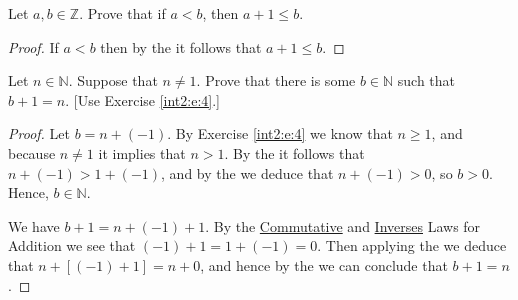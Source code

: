 \Newpage
\begin{exercise} %
	Let $a, b \in \mathbb{Z}$. Prove that if $a < b$, then $a + 1 \leq b$.
\end{exercise}

\begin{proof}
	If $a < b$ then by the  it follows that $a + 1 \leq b$.
\end{proof}


\Newpage
\begin{exercise} %
	\label{int2:e:6}
	Let $n \in \mathbb{N}$. Suppose that $n \neq 1$. Prove that there is some $b \in \mathbb{N}$ such that $b + 1 = n$.
	\hfill [Use Exercise \ref{int2:e:4}.]
\end{exercise}

\begin{proof}
	Let $b = n + (-1)$. By Exercise \ref{int2:e:4} we know that $n \geq 1$, and because $n \not= 1$ it implies that $n > 1$. By the  it follows that $n + (-1) > 1 + (-1)$, and by the  we deduce that $n + (-1) > 0$, so $b > 0$. Hence, $b \in \mathbb{N}$.

	We have $b + 1 = n + (-1) + 1$. By the \hyperref[int2:d:oid:commutative_add]{Commutative} and \hyperref[int2:d:oid:inverses_add]{Inverses} Laws for Addition we see that $(-1) + 1 = 1 + (-1) = 0$. Then applying the  we deduce that $n + [(-1) + 1] = n + 0$, and hence by the  we can conclude that $b + 1 = n$.
\end{proof}


